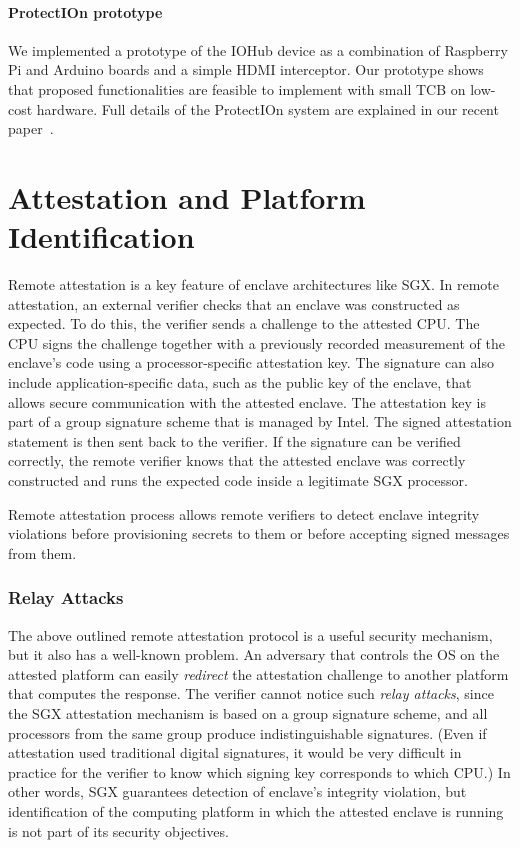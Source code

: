 \documentclass[letterpaper,twocolumn,10pt]{article}
\newcommand{\protection}{\textsf{ProtectIOn}\xspace}
\newcommand{\hub}{\textsf{IOHub}\xspace}
\begin{document}
\paragraph{\protection prototype} 

We implemented a prototype of the \hub device as a combination of Raspberry Pi and Arduino boards and a simple HDMI interceptor. Our prototype shows that proposed functionalities are feasible to implement with small TCB on low-cost hardware. Full details of the \protection system are explained in our recent paper~\cite{protection}.


\section*{Attestation and Platform Identification}

Remote attestation is a key feature of enclave architectures like SGX. In remote attestation, an external verifier checks that an enclave was constructed as expected. To do this, the verifier sends a challenge to the attested CPU. The CPU signs the challenge together with a previously recorded measurement of the enclave's code using a processor-specific attestation key. The signature can also include application-specific data, such as the public key of the enclave, that allows secure communication with the attested enclave. The attestation key is part of a group signature scheme that is managed by Intel. The signed attestation statement is then sent back to the verifier. If the signature can be verified correctly, the remote verifier knows that the attested enclave was correctly constructed and runs the expected code inside a legitimate SGX processor. 

Remote attestation process allows remote verifiers to detect enclave integrity violations before provisioning secrets to them or before accepting signed messages from them.  


\subsubsection*{Relay Attacks}

The above outlined remote attestation protocol is a useful security mechanism, but it also has a well-known problem. 
An adversary that controls the OS on the attested platform can easily \emph{redirect} the attestation challenge to another platform that computes the response. 
The verifier cannot notice such \emph{relay attacks}, since the SGX attestation mechanism is based on a group signature scheme, and all processors from the same group produce indistinguishable signatures. (Even if attestation used traditional digital signatures, it would be very difficult in practice for the verifier to know which signing key corresponds to which CPU.) In other words, SGX guarantees detection of enclave's integrity violation, but  identification of the computing platform in which the attested enclave is running is not part of its security objectives.
\end{document}
